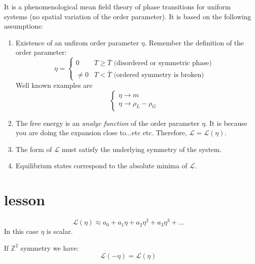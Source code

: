 \documentclass[../main/main.tex]{subfiles}
\begin{document}
It is a phenomenological mean field theory of phase transitions for uniform systems (no spatial variation of the order parameter). It is based on the following assumptions:
\begin{enumerate}
\item Existence of an unfirom order parameter \( \eta   \). Remember the definition of the order parameter:
\begin{equation}
  \eta   = \begin{cases}
    0 & T \ge \bar{T} \text{ (disordered or symmetric phase)}\\
    \neq 0 & T < \bar{T}  \text{ (ordered symmetry is broken)}
\end{cases}
\end{equation}
Well known examples are
\begin{equation}
  \begin{cases}
   \eta \rightarrow m \\
  \eta  \rightarrow \rho _L - \rho _G
  \end{cases}
\end{equation}
\item The free energy is an \emph{analyc function}  of the order parameter \( \eta   \). It is because you are doing the expansion close to...etc etc. Therefore, \( \mathcal{L} = \mathcal{L} (\eta ) \).
\item The form of \( \mathcal{L} \) must satisfy the underlying symmetry of the system.
\item Equilibrium states correspond to the absolute minima of \( \mathcal{L} \).
\end{enumerate}







\section{lesson}

\begin{equation}
  \mathcal{L} (\eta ) \approx a_0 + a_1 \eta + a_2 \eta ^2 + a_3 \eta ^3 + \dots
\end{equation}
In this case \( \eta  \) is scalar.

If \( \mathbb{Z}^2 \) symmetry we have:
\begin{equation}
  \mathcal{L} (-\eta ) =   \mathcal{L} (\eta )
\end{equation}
\end{document}
